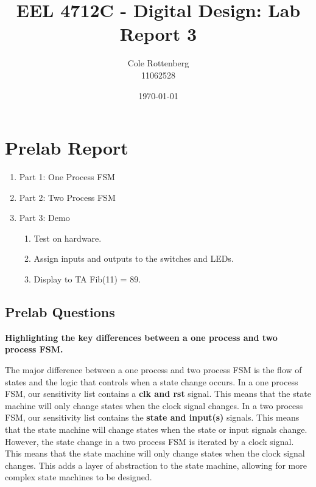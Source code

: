 \documentclass{article}
\title{EEL 4712C - Digital Design: Lab Report 3}
\author{Cole Rottenberg \\ 11062528}
\date{\today}
\begin{document}
\maketitle

\section*{Prelab Report}
\begin{enumerate}
  \item Part 1: One Process FSM
  \item Part 2: Two Process FSM
  \item Part 3: Demo
  \begin{enumerate}
    \item Test on hardware.
    \item Assign inputs and outputs to the switches and LEDs.
    \item Display to TA Fib(11) = 89.
  \end{enumerate}
\end{enumerate}
\subsection*{Prelab Questions}
\textbf{Highlighting the key differences between a one process and two process FSM.}

The major difference between a one process and two process FSM is the flow of states and the logic that controls when a state change occurs. In a one process FSM, our sensitivity list contains a \textbf{clk and rst} signal. This means that the state machine will only change states when the clock signal changes. In a two process FSM, our sensitivity list contains the \textbf{state and input(s)} signals. This means that the state machine will change states when the state or input signals change. However, the state change in a two process FSM is iterated by a clock signal. This means that the state machine will only change states when the clock signal changes. This adds a layer of abstraction to the state machine, allowing for more complex state machines to be designed.
\end{document}
